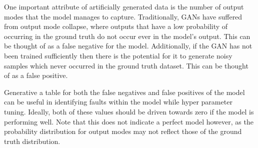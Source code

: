 One important attribute of artificially generated data is the number of output modes that the model manages to capture. Traditionally, GANs have suffered from output mode collapse, where outputs that have a low probability of occurring in the ground truth do not occur ever in the model's output. This can be thought of as a false negative for the model. Additionally, if the GAN has not been trained sufficiently then there is the potential for it to generate noisy samples which never occurred in the ground truth dataset. This can be thought of as a false positive. 

Generative a table for both the false negatives and false positives of the model can be useful in identifying faults within the model while hyper parameter tuning. Ideally, both of these values should be driven towards zero if the model is performing well. Note that this does not indicate a perfect model however, as the probability distribution for output modes may not reflect those of the ground truth distribution. 
